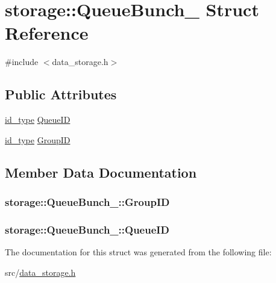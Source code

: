 \hypertarget{structstorage_1_1QueueBunch__}{
\section{storage::QueueBunch\_\- Struct Reference}
\label{db/d0b/structstorage_1_1QueueBunch__}
}


{\ttfamily \#include $<$data\_\-storage.h$>$}

\subsection*{Public Attributes}
\begin{DoxyCompactItemize}
\item 
\hyperlink{types_8h_a0b60c08a3ab1435cccc5643d32d8ccee}{id\_\-type} \hyperlink{structstorage_1_1QueueBunch___a2665693a394fa79076cf6983b91354a4}{QueueID}
\item 
\hyperlink{types_8h_a0b60c08a3ab1435cccc5643d32d8ccee}{id\_\-type} \hyperlink{structstorage_1_1QueueBunch___ac4d1b2ea07850fa32ca7fceb5db12ff8}{GroupID}
\end{DoxyCompactItemize}


\subsection{Member Data Documentation}
\hypertarget{structstorage_1_1QueueBunch___ac4d1b2ea07850fa32ca7fceb5db12ff8}{
\subsubsection[{GroupID}]{ {\bf storage::QueueBunch\_\-::GroupID}}}
\label{db/d0b/structstorage_1_1QueueBunch___ac4d1b2ea07850fa32ca7fceb5db12ff8}
\hypertarget{structstorage_1_1QueueBunch___a2665693a394fa79076cf6983b91354a4}{
\subsubsection[{QueueID}]{ {\bf storage::QueueBunch\_\-::QueueID}}}
\label{db/d0b/structstorage_1_1QueueBunch___a2665693a394fa79076cf6983b91354a4}


The documentation for this struct was generated from the following file:\begin{DoxyCompactItemize}
\item 
src/\hyperlink{data__storage_8h}{data\_\-storage.h}\end{DoxyCompactItemize}
